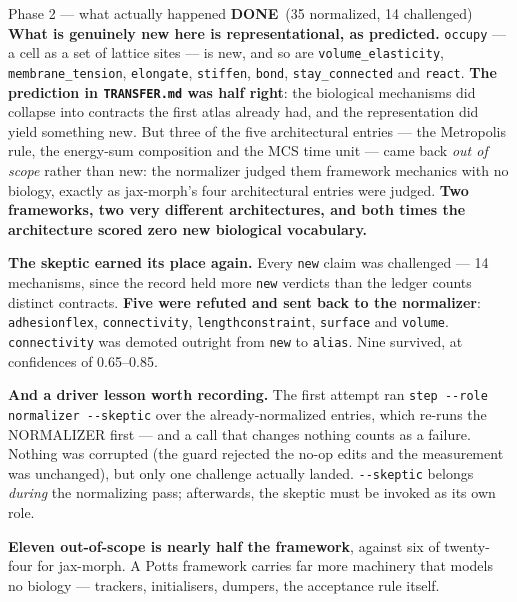 \documentclass[11pt,a4paper]{article}
\newcommand{\code}[1]{\texttt{#1}}
\newcommand{\done}{\textcolor{good}{\textbf{DONE}}}
\begin{document}
\begin{phasebox}{Phase 2 --- what actually happened \hfill \done\ (35 normalized, 14 challenged)}
\textbf{What is genuinely new here is representational, as predicted.} \code{occupy} --- a cell as
a set of lattice sites --- is new, and so are \code{volume\_elasticity},
\code{membrane\_tension}, \code{elongate}, \code{stiffen}, \code{bond}, \code{stay\_connected} and
\code{react}. \textbf{The prediction in \code{TRANSFER.md} was half right}: the biological
mechanisms did collapse into contracts the first atlas already had, and the representation did
yield something new. But three of the five architectural entries --- the Metropolis rule, the
energy-sum composition and the MCS time unit --- came back \emph{out of scope} rather than new:
the normalizer judged them framework mechanics with no biology, exactly as jax-morph's four
architectural entries were judged. \textbf{Two frameworks, two very different architectures, and
both times the architecture scored zero new biological vocabulary.}

\textbf{The skeptic earned its place again.} Every \code{new} claim was challenged --- 14
mechanisms, since the record held more \code{new} verdicts than the ledger counts distinct
contracts. \textbf{Five were refuted and sent back to the normalizer}: \code{adhesionflex},
\code{connectivity}, \code{lengthconstraint}, \code{surface} and \code{volume}. \code{connectivity}
was demoted outright from \code{new} to \code{alias}. Nine survived, at confidences of 0.65--0.85.

\textbf{And a driver lesson worth recording.} The first attempt ran
\code{step -{}-role normalizer -{}-skeptic} over the already-normalized entries, which re-runs the
NORMALIZER first --- and a call that changes nothing counts as a failure. Nothing was corrupted
(the guard rejected the no-op edits and the measurement was unchanged), but only one challenge
actually landed. \code{-{}-skeptic} belongs \emph{during} the normalizing pass; afterwards, the
skeptic must be invoked as its own role.

\textbf{Eleven out-of-scope is nearly half the framework}, against six of twenty-four for
jax-morph. A Potts framework carries far more machinery that models no biology --- trackers,
initialisers, dumpers, the acceptance rule itself.
\end{phasebox}
\end{document}
